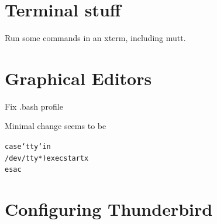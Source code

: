 
\section{Terminal stuff}

Run some commands in an xterm, including mutt.

\section{Graphical Editors}

\begin{note}
  Fix .bash profile

  Minimal change seems to be

\begin{alltt}
case `tty` in
/dev/tty*) exec startx
esac
\end{alltt}
\end{note}


\section{Configuring Thunderbird}

